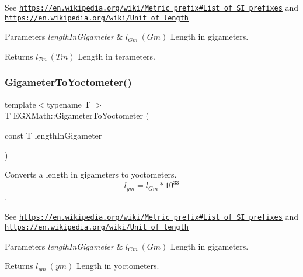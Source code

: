 See \href{https://en.wikipedia.org/wiki/Metric_prefix#List_of_SI_prefixes}{\tt https\+://en.\+wikipedia.\+org/wiki/\+Metric\+\_\+prefix\#\+List\+\_\+of\+\_\+\+S\+I\+\_\+prefixes} and \href{https://en.wikipedia.org/wiki/Unit_of_length}{\tt https\+://en.\+wikipedia.\+org/wiki/\+Unit\+\_\+of\+\_\+length} 
\begin{DoxyParams}{Parameters}
{\em length\+In\+Gigameter} & $ l_{Gm}\ (Gm)$ Length in gigameters. \\
\hline
\end{DoxyParams}
\begin{DoxyReturn}{Returns}
$ l_{Tm}\ (Tm)$ Length in terameters. 
\end{DoxyReturn}
\mbox{\label{group___e_g_x_math-_conversions-_length_conversions-_s_i-_gigameter-_s_i_ga2eff69e0a00032c24617fde4ac30bd49}} 
\subsubsection{\texorpdfstring{Gigameter\+To\+Yoctometer()}{GigameterToYoctometer()}}
{\footnotesize\ttfamily template$<$typename T $>$ \\
T E\+G\+X\+Math\+::\+Gigameter\+To\+Yoctometer (\begin{DoxyParamCaption}\item[{const T}]{length\+In\+Gigameter }\end{DoxyParamCaption})}



Converts a length in gigameters to yoctometers. \[ l_{ym}=l_{Gm} * 10^{33} \]. 

See \href{https://en.wikipedia.org/wiki/Metric_prefix#List_of_SI_prefixes}{\tt https\+://en.\+wikipedia.\+org/wiki/\+Metric\+\_\+prefix\#\+List\+\_\+of\+\_\+\+S\+I\+\_\+prefixes} and \href{https://en.wikipedia.org/wiki/Unit_of_length}{\tt https\+://en.\+wikipedia.\+org/wiki/\+Unit\+\_\+of\+\_\+length} 
\begin{DoxyParams}{Parameters}
{\em length\+In\+Gigameter} & $ l_{Gm}\ (Gm)$ Length in gigameters. \\
\hline
\end{DoxyParams}
\begin{DoxyReturn}{Returns}
$ l_{ym}\ (ym)$ Length in yoctometers. 
\end{DoxyReturn}
\mbox{\label{group___e_g_x_math-_conversions-_length_conversions-_s_i-_gigameter-_s_i_ga311d6ae40f97487de660c9fb0310ec5e}} 
